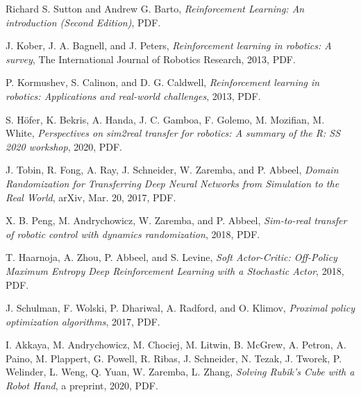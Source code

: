\documentclass[11pt]{article}
\begin{document}

\begin{thebibliography}{9}
    Richard S. Sutton and Andrew G. Barto,
    \textit{Reinforcement Learning: An introduction (Second Edition)},
    PDF.
    
    J. Kober, J. A. Bagnell, and J. Peters,
    \textit{Reinforcement learning in robotics: A survey},
    The International Journal of Robotics Research, 2013, PDF.
    
    P. Kormushev, S. Calinon, and D. G. Caldwell,
    \textit{Reinforcement learning in robotics: Applications and real-world challenges},
    2013, PDF.
    
    S. Höfer, K. Bekris, A. Handa, J. C. Gamboa, F. Golemo, M. Mozifian, M. White,
    \textit{Perspectives on sim2real transfer for robotics: A summary of the R: SS 2020 workshop},
    2020, PDF.
    
    J. Tobin, R. Fong, A. Ray, J. Schneider, W. Zaremba, and P. Abbeel,
    \textit{Domain Randomization for Transferring Deep Neural Networks from Simulation to the Real World},
    arXiv, Mar. 20, 2017, PDF.
    
    X. B. Peng, M. Andrychowicz, W. Zaremba, and P. Abbeel,
    \textit{Sim-to-real transfer of robotic control with dynamics randomization},
    2018, PDF.

    T. Haarnoja, A. Zhou, P. Abbeel, and S. Levine,
    \textit{Soft Actor-Critic: Off-Policy Maximum Entropy Deep Reinforcement Learning with a Stochastic Actor},
    2018, PDF.

    J. Schulman, F. Wolski, P. Dhariwal, A. Radford, and O. Klimov,
    \textit{Proximal policy optimization algorithms},
    2017, PDF.

    I. Akkaya, M. Andrychowicz, M. Chociej, M. Litwin, B. McGrew, A. Petron, A. Paino, M. Plappert, G. Powell, R. Ribas, J. Schneider, N. Tezak, J. Tworek, P. Welinder, L. Weng, Q. Yuan, W. Zaremba, L. Zhang,
    \textit{Solving Rubik’s Cube with a Robot Hand}, a preprint, 2020, PDF.


\end{thebibliography}
\end{document}
